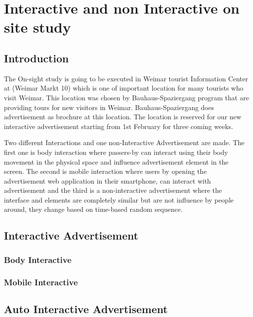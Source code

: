 \chapter{Interactive and non Interactive on site study} %

\label{Chapter8} %

\section{Introduction}

The On-sight study is going to be executed in Weimar tourist Information Center at (Weimar Markt 10) which is one of important location for many tourists who visit Weimar. This location was chosen by Bauhaus-Spaziergang program that are providing tours for new visitors in Weimar. Bauhaus-Spaziergang does advertisement as brochure at this location. The location is reserved for our new interactive advertisement starting from 1st February for three coming weeks. 

Two different Interactions and one non-Interactive Advertisement are made. The first one is body interaction where passers-by can interact using their body movement in the physical space and influence advertisement element in the screen. The second is mobile interaction where users by opening the advertisement web application in their smartphone, can interact with advertisement and the third is a non-interactive advertisement where the interface and elements are completely similar but are not influence by people around, they change based on time-based random sequence. 

\section{Interactive Advertisement}

\subsection{Body Interactive}

\subsection{Mobile Interactive}

\section{Auto Interactive Advertisement}


